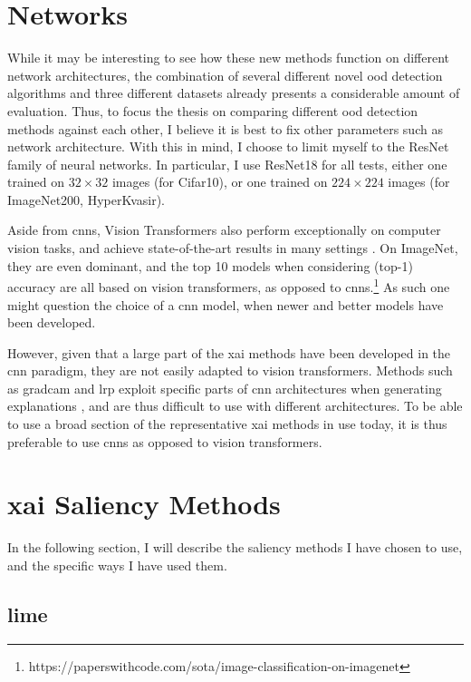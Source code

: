 \documentclass[UKenglish]{uiomasterthesis} %
\theoremstyle{definition}
\begin{document}
\section{Networks}

While it may be interesting to see how these new methods function on different network architectures, the combination of several different novel \ac{ood} detection algorithms and three different datasets already presents a considerable amount of evaluation. Thus, to focus the thesis on comparing different \ac{ood} detection methods against each other, I believe it is best to fix other parameters such as network architecture. With this in mind, I choose to limit myself to the ResNet \cite{resnet} family of neural networks. In particular, I use ResNet18 for all tests, either one trained on $32 \times 32$ images (for Cifar10), or one trained on $224 \times 224$ images (for ImageNet200, HyperKvasir).

Aside from \acp{cnn}, Vision Transformers also perform exceptionally on computer vision tasks, and achieve state-of-the-art results in many settings \cite{vit}. On ImageNet, they are even dominant, and the top 10 models when considering (top-1) accuracy are all based on vision transformers, as opposed to \acp{cnn}.\footnote{https://paperswithcode.com/sota/image-classification-on-imagenet} As such one might question the choice of a \ac{cnn} model, when newer and better models have been developed.

However, given that a large part of the \ac{xai} methods have been developed in the \ac{cnn} paradigm, they are not easily adapted to vision transformers. Methods such as \ac{gradcam} and \ac{lrp} exploit specific parts of \ac{cnn} architectures when generating explanations \cite{legrad}, and are thus difficult to use with different architectures. To be able to use a broad section of the representative \ac{xai} methods in use today, it is thus preferable to use \acp{cnn} as opposed to vision transformers.

\section{\ac{xai} Saliency Methods}

In the following section, I will describe the saliency methods I have chosen to use, and the specific ways I have used them.

\subsection{\ac{lime}}
\end{document}
